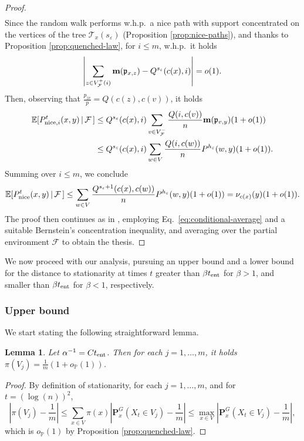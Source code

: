 \documentclass[11pt,oneside]{amsart}
\numberwithin{equation}{section}  %
\theoremstyle{plain}
\newtheorem{lemma}[theorem]{Lemma}
\newcommand{\whp}{{w.h.p.~}}
\newcommand{\eps}{\varepsilon}
\newcommand{\E}{\mathbb{E}}
\newcommand{\p}{\mathbb{P}}
\newcommand{\op}{o_{\p}}
\newcommand{\tent}{t_{\textup{ent}}}
\newcommand{\quenchG}{\mathbf{P}^G}
\newcommand{\semi}{{Q}}
\newcommand{\mass}{\textup{\textbf{m}}}
\newcommand{\pat}{\mathfrak{p}}
\newcommand{\h}{{h_\eps}}
\newcommand{\s}{{s_\eps}}
\begin{document}
\begin{proof}
\begin{align*}
		\end{align*}
		Since the random walk performs \whp a nice path  with support concentrated on the vertices of the tree $\mathcal{T}_x(\s)$ (Proposition \ref{prop:nice-paths}), and thanks to Proposition \ref{prop:quenched-law}, for $i \le m$, \whp it holds
    	\begin{equation}
		      \left|\sum_{z \in V^+_\mathcal{F}(i)} \mass(\pat_{x,z}) 
		      - \semi^ {\s} (c(x),i) \right|=o(1).
		\end{equation}
        Then, observing that $\frac{p_{zv}}{p}=\semi(c(z),c(v))$, it holds
			\begin{align*}
			{\E[P_{{\rm nice},i}^t(x,y)\,|\, \mathcal{F}\,]}
			&\le \semi^ \s (c(x),i)
			\sum_{v \in V^-_\mathcal{F}}  \frac{\semi(i,c(v))}{n}\mass(\pat_{v,y})(1+o(1)) \\
			&\le \semi^{\s} (c(x),i)  \sum_{w \in V} \frac{\semi (i,c(w))}{n} P^{\h}(w,y)(1+o(1)).
		\end{align*}
%
		Summing over $i \le m$, we conclude
		\begin{align} \label{eq:conditional-average}
			\E[P_{\rm nice}^t(x,y)\,|\, \mathcal{F}\,] \le \sum_{w \in V}\frac{\semi^{\s+1}(c(x),c(w)) }{n} P^{\h}(w,y)(1+o(1))= \nu_{c(x)}(y)(1+o(1)).
		\end{align}
		The proof then continues as in \cite[Prop. 3]{BP}, employing Eq.~\eqref{eq:conditional-average} 
        and a suitable Bernstein's concentration inequality,
        and averaging over the partial environment $\mathcal{F}$ to obtain the thesis.
	\end{proof}

	
	We now proceed with our analysis, pursuing an upper bound and a lower bound for the distance to stationarity at times $t$ greater than $\beta \tent$ for $\beta>1$, and smaller than $\beta\tent$ for $\beta<1$, respectively.
    
	\subsubsection{Upper bound} We start stating the following straightforward lemma.    
    \begin{lemma}
	\label{lemma:ciritcal-1/m}
	Let $\alpha^{-1}=C\tent$. Then for each $j=1,\dots, m$, it holds $\pi(V_j)=\frac1m(1+\op(1))$.
\end{lemma}
\begin{proof}
	By definition of stationarity, for each $j=1,\dots,m$, and for $t=(\log(n))^2$,
	\begin{equation}
		\left|\pi(V_j)-\frac1m\right|
		\le \sum_{x \in V}\pi(x)\left|\quenchG_x(X_t \in V_j)-\frac1m\right| \le \max_{x \in V} \left|\quenchG_x(X_t \in V_j)-\frac1m\right|,
	\end{equation}
	which is $\op(1)$ by Proposition \ref{prop:quenched-law}.
\end{proof}
\end{document}
